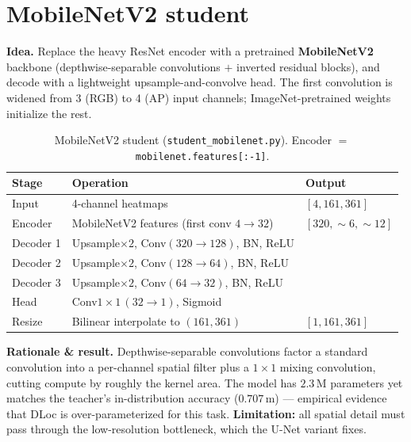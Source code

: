 \documentclass[11pt,a4paper]{article}
\newcommand{\code}[1]{\texttt{\small #1}}
\begin{document}
\section{MobileNetV2 student}

\textbf{Idea.} Replace the heavy ResNet encoder with a pretrained \textbf{MobileNetV2} backbone
(depthwise-separable convolutions $+$ inverted residual blocks), and decode with a lightweight
upsample-and-convolve head. The first convolution is widened from 3 (RGB) to 4 (AP) input
channels; ImageNet-pretrained weights initialize the rest.

\begin{table}[h]
\centering
\caption{MobileNetV2 student (\code{student\_mobilenet.py}). Encoder $=$ \code{mobilenet.features[:-1]}.}
\begin{tabular}{@{}lll@{}}
\toprule
Stage & Operation & Output \\
\midrule
Input        & 4-channel heatmaps                                   & $[4,161,361]$ \\
Encoder      & MobileNetV2 features (first conv $4\!\to\!32$)       & $[320, \sim\!6, \sim\!12]$ \\
Decoder 1    & Upsample$\times2$, Conv$(320\!\to\!128)$, BN, ReLU   & \\
Decoder 2    & Upsample$\times2$, Conv$(128\!\to\!64)$, BN, ReLU    & \\
Decoder 3    & Upsample$\times2$, Conv$(64\!\to\!32)$, BN, ReLU     & \\
Head         & Conv$1\times1\,(32\!\to\!1)$, Sigmoid                & \\
Resize       & Bilinear interpolate to $(161,361)$                 & $[1,161,361]$ \\
\bottomrule
\end{tabular}
\end{table}

\textbf{Rationale \& result.} Depthwise-separable convolutions factor a standard convolution into
a per-channel spatial filter plus a $1\times1$ mixing convolution, cutting compute by roughly the
kernel area. The model has $2.3$\,M parameters yet matches the teacher's in-distribution accuracy
($0.707$\,m) --- empirical evidence that DLoc is over-parameterized for this task. \textbf{Limitation:}
all spatial detail must pass through the low-resolution bottleneck, which the U-Net variant fixes.

\end{document}
